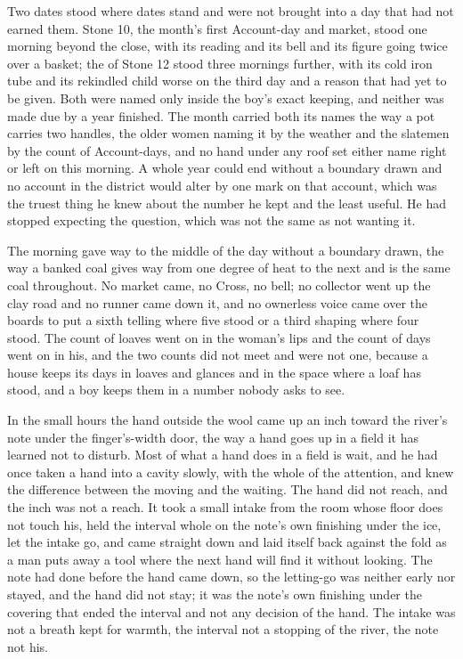 Two dates stood where dates stand and were not brought into a day that had not earned them. Stone 10, the month's first Account-day and market, stood one morning beyond the close, with its reading and its bell and its figure going twice over a basket; the  of Stone 12 stood three mornings further, with its cold iron tube and its rekindled child worse on the third day and a reason that had yet to be given. Both were named only inside the boy's exact keeping, and neither was made due by a year finished. The month carried both its names the way a pot carries two handles, the older women naming it by the weather and the slatemen by the count of Account-days, and no hand under any roof set either name right or left on this morning. A whole year could end without a boundary drawn and no account in the district would alter by one mark on that account, which was the truest thing he knew about the number he kept and the least useful. He had stopped expecting the question, which was not the same as not wanting it.

The morning gave way to the middle of the day without a boundary drawn, the way a banked coal gives way from one degree of heat to the next and is the same coal throughout. No market came, no Cross, no bell; no collector went up the clay road and no runner came down it, and no ownerless voice came over the boards to put a sixth telling where five stood or a third shaping where four stood. The count of loaves went on in the woman's lips and the count of days went on in his, and the two counts did not meet and were not one, because a house keeps its days in loaves and glances and in the space where a loaf has stood, and a boy keeps them in a number nobody asks to see.

\scenebreak

In the small hours the hand outside the wool came up an inch toward the river's note under the finger's-width door, the way a hand goes up in a field it has learned not to disturb. Most of what a hand does in a field is wait, and he had once taken a hand into a cavity slowly, with the whole of the attention, and knew the difference between the moving and the waiting. The hand did not reach, and the inch was not a reach. It took a small intake from the room whose floor does not touch his, held the interval whole on the note's own finishing under the ice, let the intake go, and came straight down and laid itself back against the fold as a man puts away a tool where the next hand will find it without looking. The note had done before the hand came down, so the letting-go was neither early nor stayed, and the hand did not stay; it was the note's own finishing under the covering that ended the interval and not any decision of the hand. The intake was not a breath kept for warmth, the interval not a stopping of the river, the note not his.

